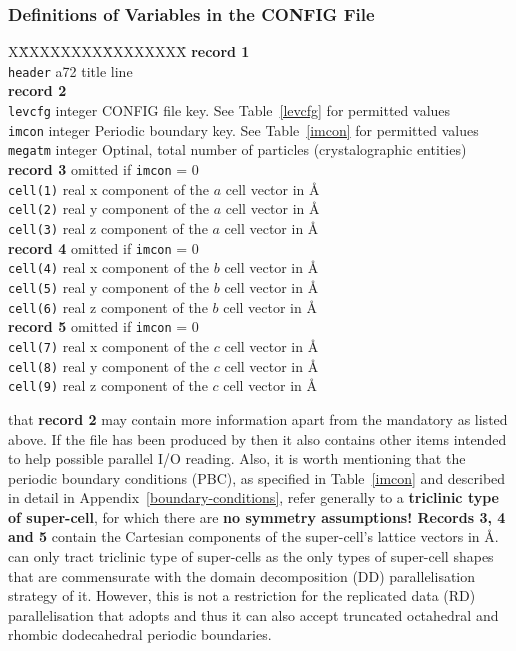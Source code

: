 \subsubsection{Definitions of Variables in the CONFIG File}

\begin{tabbing}
X\=XXXXXXXX\=XXXXXXXX\=\kill
{\bf record 1} \\
\> {\tt header}  \> a72     \> title line \\
{\bf record 2} \\
\> {\tt levcfg}  \> integer \> CONFIG file key.  See Table~\ref{levcfg} for permitted values \\
\> {\tt imcon}   \> integer \> Periodic boundary key. See Table~\ref{imcon} for permitted values \\
\> {\tt megatm}  \> integer \> Optinal, total number of particles (crystalographic entities) \\
{\bf record 3}   \>         \> omitted if {\tt imcon} = 0 \\
\> {\tt cell(1)} \> real    \> x component of the $a$ cell vector in \AA \\
\> {\tt cell(2)} \> real    \> y component of the $a$ cell vector in \AA \\
\> {\tt cell(3)} \> real    \> z component of the $a$ cell vector in \AA \\
{\bf record 4}   \>         \> omitted if {\tt imcon} = 0 \\
\> {\tt cell(4)} \> real    \> x component of the $b$ cell vector in \AA \\
\> {\tt cell(5)} \> real    \> y component of the $b$ cell vector in \AA \\
\> {\tt cell(6)} \> real    \> z component of the $b$ cell vector in \AA \\
{\bf record 5}   \>         \> omitted if {\tt imcon} = 0 \\
\> {\tt cell(7)} \> real    \> x component of the $c$ cell vector in \AA \\
\> {\tt cell(8)} \> real    \> y component of the $c$ cell vector in \AA \\
\> {\tt cell(9)} \> real    \> z component of the $c$ cell vector in \AA
\end{tabbing}
 that {\bf record 2} may contain more information
apart from the mandatory as listed above.  If the file has been
produced by \D then it also contains other items intended to help
possible parallel I/O reading. Also, it is worth mentioning that the
periodic boundary conditions (PBC), as specified in Table~\ref{imcon}
and described in detail in Appendix~\ref{boundary-conditions}, refer
generally to a {\bf triclinic type of super-cell}, for which there
are {\bf no symmetry assumptions!  Records 3, 4 and 5} contain the
Cartesian components of the super-cell's lattice vectors in \AA.
\D can only tract triclinic type of super-cells as the only types
of super-cell shapes that are commensurate with the domain decomposition
(DD) parallelisation strategy of it.  However, this is not a restriction
for the replicated data (RD) parallelisation that \C adopts and thus
it can also accept truncated octahedral and rhombic dodecahedral
periodic boundaries.

